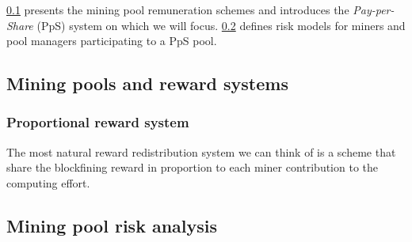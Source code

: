\noindent \cref{ssec:mining_pool_reward_system} presents the mining pool remuneration schemes and introduces the \textit{Pay-per-Share} (PpS) system on which we will focus. \cref{ssec:mining_pool_risk_analysis} defines risk models for miners and pool managers participating to a PpS pool.

\subsection{Mining pools and reward systems}\label{ssec:mining_pool_reward_system}
\subsubsection{Proportional reward system}
The most natural reward redistribution system we can think of is a scheme that share the blockfining reward in proportion to each miner contribution to the computing effort. 
\subsection{Mining pool risk analysis}\label{ssec:mining_pool_risk_analysis}

\newpage